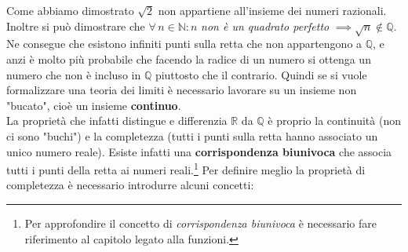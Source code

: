 Come abbiamo dimostrato $\sqrt{2}$ non appartiene all'insieme dei numeri razionali. Inoltre si può dimostrare che $\forall\, n \in \mathbb{N} : n$ \textit{non è un quadrato perfetto} $\implies \sqrt{n} \notin \mathbb{Q}$.
Ne consegue che esistono infiniti punti sulla retta che non appartengono a $\mathbb{Q}$, e anzi è molto più probabile che facendo la radice di un numero si ottenga un numero che non è incluso in $\mathbb{Q}$ piuttosto che il contrario. Quindi se si vuole formalizzare una teoria dei limiti è necessario lavorare su un insieme non "bucato", cioè un insieme \textbf{continuo}.\\

La proprietà che infatti distingue e differenzia $\mathbb{R}$ da $\mathbb{Q}$ è proprio la continuità (non ci sono "buchi") e la completezza (tutti i punti sulla retta hanno associato un unico numero reale). Esiste infatti una \textbf{corrispondenza biunivoca} che associa tutti i punti della retta ai numeri reali.\footnote{Per approfondire il concetto di \textit{corrispondenza biunivoca} è necessario fare riferimento al capitolo legato alla funzioni.}
Per definire meglio la proprietà di completezza è necessario introdurre alcuni concetti:

